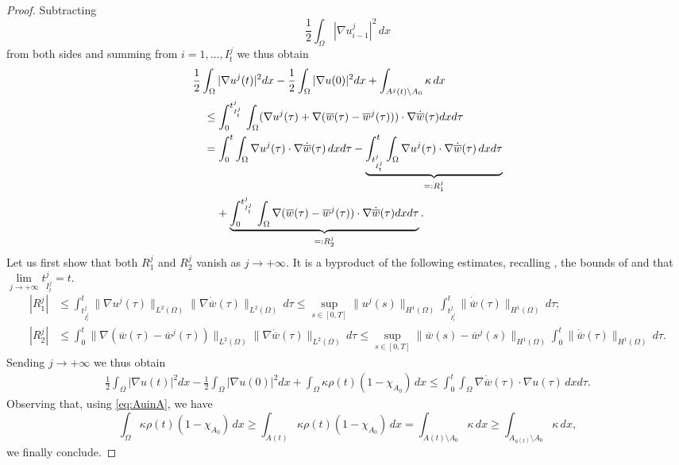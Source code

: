 \documentclass[a4paper,11pt,reqno]{amsart}
\numberwithin{equation}{section}
\theoremstyle{definition}
\theoremstyle{remark}
\begin{document}
\begin{proof}
    Subtracting
    \begin{equation}
        \frac 12 \int_\Omega |\nabla u^j_{i-1}|^2 \, dx
    \end{equation}
    from both sides and summing from $i=1, \dots, I^j_t$ we thus obtain
    \begin{align}
        &\frac 12 \int_\Omega |\nabla u^j(t)|^2 dx-\frac 12 \int_\Omega |\nabla u(0)|^2 dx+\int_{A^j(t)\setminus A_0}\kappa\,d x\\
        & \quad \le \int_0^{t^j_{I^j_t}} \,\int_\Omega (\nabla u^j(\tau)+\nabla (\overline w(\tau)-\overline w^j(\tau)))\cdot \nabla \dot{\overline w}(\tau) dxd\tau\\
        &\quad = \int_0^t \int_\Omega \nabla u^j(\tau)\cdot \nabla \dot{\overline w}(\tau)\, dxd\tau-\underbrace{\int_{t^j_{I^j_t}}^t \int_\Omega \nabla u^j(\tau)\cdot \nabla \dot{\overline w}(\tau)\, dxd\tau}_{=: R_1^j}\\
        &\quad \hphantom{=}\,\, +\underbrace{\int_0^{t^j_{I^j_t}} \,\int_\Omega \nabla (\overline w(\tau)-\overline w^j(\tau))\cdot \nabla \dot{\overline w}(\tau) dxd\tau}_{=: R_2^j}.
    \end{align}
Let us first show that both $R_1^j$ and $R_2^j$ vanish as $j\to +\infty$. It is a byproduct of the following estimates, recalling , the bounds of  and that $\lim\limits_{j\to +\infty} t^j_{I^j_t}=t$.
\begin{align}
    |R_1^j| & \le \int_{t^j_{I^j_t}}^t \|\nabla u^j(\tau)\|_{L^2(\Omega)} \|\nabla \dot{\overline w}(\tau)\|_{L^2(\Omega)} \, d\tau\le \sup\limits_{s\in [0,T]}\| u^j(s)\|_{H^1(\Omega)}\int_{t^j_{I^j_t}}^t \| \dot{\overline w}(\tau)\|_{H^1(\Omega)}\, d\tau;\\
    |R_2^j| & \le\! \int_0^t \!\! \|\nabla (\overline w(\tau){-}\overline w^j(\tau))\|_{L^2(\Omega)}\|\nabla \dot{\overline w}(\tau)\|_{L^2(\Omega)}\, d\tau\le \!\sup\limits_{s\in [0,T]}\| \overline w(s){-}\overline w^j(s)\|_{H^1(\Omega)}\!\int_0^t \!\!\| \dot{\overline w}(\tau)\|_{H^1(\Omega)}\, d\tau.
\end{align}
Sending $j\to +\infty$ we thus obtain
\begin{align}
    \frac 12 \int_\Omega |\nabla u(t)|^2 dx-\frac 12 \int_\Omega |\nabla u(0)|^2 dx+\int_{\Omega}\kappa\rho(t)(1-\chi_{A_0})\,d x\le \int_0^t \int_\Omega  \nabla \dot{\overline w}(\tau)\cdot \nabla u(\tau)\, dxd\tau. 
\end{align}
Observing that, using \eqref{eq:AuinA}, we have
\begin{equation}
    \int_{\Omega}\kappa\rho(t)(1-\chi_{A_0})\,d x\ge \int_{A(t)}\kappa\rho(t)(1-\chi_{A_0})\,d x=\int_{A(t)\setminus A_0}\kappa\,d x\ge \int_{A_{u(t)}\setminus A_0}\kappa\,d x,
\end{equation}
we finally conclude.            
\end{proof}
\end{document}
